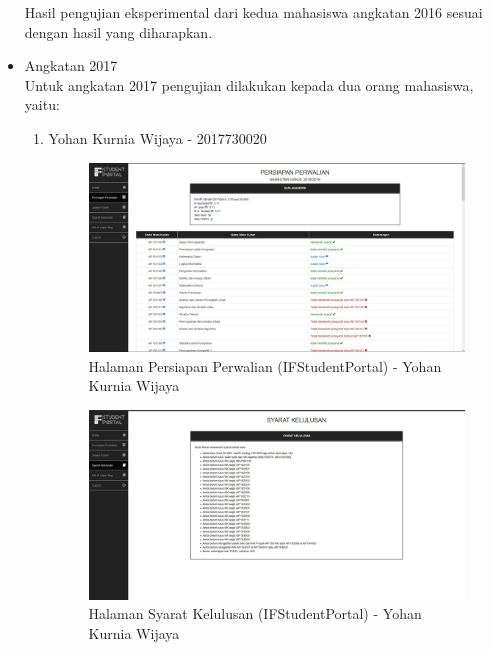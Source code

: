 \begin{itemize}
\begin{enumerate}
	\end{enumerate}
	Hasil pengujian eksperimental dari kedua mahasiswa angkatan 2016 sesuai dengan hasil yang diharapkan.
	\item Angkatan 2017 \\
	Untuk angkatan 2017 pengujian dilakukan kepada dua orang mahasiswa, yaitu:
	\begin{enumerate}
		\item Yohan Kurnia Wijaya - 2017730020
		\begin{figure}[H]
			\centering
			\includegraphics[scale=0.325]{Gambar/HasilPengujian/2017_1_persiapan_perwalian_ifstudentportal}
			\caption{Halaman Persiapan Perwalian (IFStudentPortal) - Yohan Kurnia Wijaya}
			\label{fig:2017_1_persiapan_perwalian_ifstudentportal}
		\end{figure}
		\begin{figure}[H]
			\centering
			\includegraphics[scale=0.325]{Gambar/HasilPengujian/2017_1_syarat_kelulusan_ifstudentportal}
			\caption{Halaman Syarat Kelulusan (IFStudentPortal) - Yohan Kurnia Wijaya}
			\label{fig:2017_1_syarat_kelulusan_ifstudentportal}
		\end{figure}
		\begin{figure}[H]
			\centering

\end{figure}
\end{enumerate}
\end{itemize}
